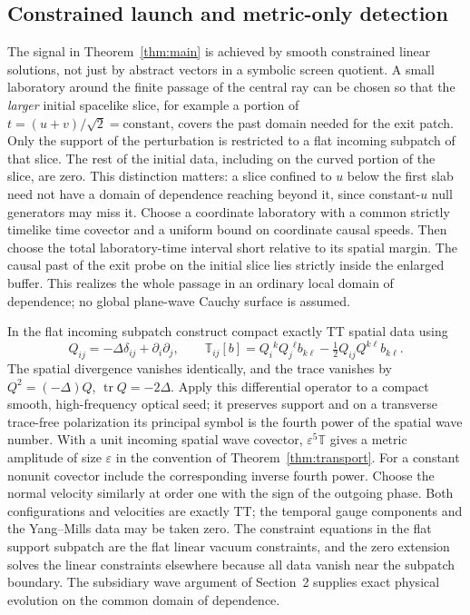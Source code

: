 \documentclass[11pt]{article}
\newcommand{\tr}{\operatorname{tr}}
\newcommand{\eps}{\varepsilon}
\begin{document}
\subsection{Constrained launch and metric-only detection}
The signal in Theorem~\ref{thm:main} is achieved by smooth constrained linear solutions, not just by abstract vectors in a symbolic screen quotient. A small laboratory around the finite passage of the central ray can be chosen so that the \emph{larger} initial spacelike slice, for example a portion of \(t=(u+v)/\sqrt2=\mathrm{constant}\), covers the past domain needed for the exit patch. Only the support of the perturbation is restricted to a flat incoming subpatch of that slice. The rest of the initial data, including on the curved portion of the slice, are zero. This distinction matters: a slice confined to \(u\) below the first slab need not have a domain of dependence reaching beyond it, since constant-\(u\) null generators may miss it. Choose a coordinate laboratory with a common strictly timelike time covector and a uniform bound on coordinate causal speeds. Then choose the total laboratory-time interval short relative to its spatial margin. The causal past of the exit probe on the initial slice lies strictly inside the enlarged buffer. This realizes the whole passage in an ordinary local domain of dependence; no global plane-wave Cauchy surface is assumed.

In the flat incoming subpatch construct compact exactly TT spatial data using
\begin{equation}\label{eq:tt}
 Q_{ij}=-\Delta\delta_{ij}+\partial_i\partial_j,\qquad
 \mathbb T_{ij}[b]=Q_i{}^kQ_j{}^\ell b_{k\ell}
                           -\tfrac12 Q_{ij}Q^{k\ell}b_{k\ell}.
\end{equation}
The spatial divergence vanishes identically, and the trace vanishes by
\(Q^2=(-\Delta)Q\), \(\tr Q=-2\Delta\). Apply this differential operator to a compact smooth, high-frequency optical seed; it preserves support and on a transverse trace-free polarization its principal symbol is the fourth power of the spatial wave number. With a unit incoming spatial wave covector, \(\eps^5\mathbb T\) gives a metric amplitude of size \(\eps\) in the convention of Theorem~\ref{thm:transport}. For a constant nonunit covector include the corresponding inverse fourth power. Choose the normal velocity similarly at order one with the sign of the outgoing phase. Both configurations and velocities are exactly TT; the temporal gauge components and the Yang--Mills data may be taken zero. The constraint equations in the flat support subpatch are the flat linear vacuum constraints, and the zero extension solves the linear constraints elsewhere because all data vanish near the subpatch boundary. The subsidiary wave argument of Section~2 supplies exact physical evolution on the common domain of dependence.
\end{document}
